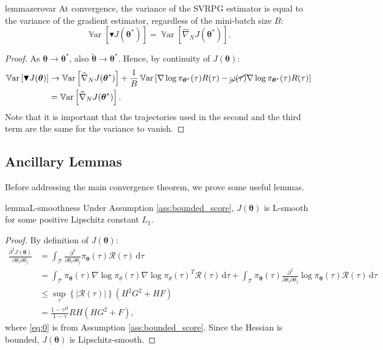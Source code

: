 \documentclass{article}
\theoremstyle{remark}
\theoremstyle{definition}
\DeclareMathOperator*{\Var}{\mathbb{V}ar}
\newcommand{\Dij}[2]{\frac{\partial^{2}{#1}}{\partial{#2}_i\partial{#2}_j}}
\newcommand{\de}{\,\mathrm{d}}
\newcommand{\vtheta}{\boldsymbol{\theta}}
\newcommand{\Tspace}{\mathcal{T}}
\newcommand{\Reward}{\mathcal{R}}
\newcommand{\pol}{\pi_{\vtheta}}
\newcommand{\score}[2]{\nabla\log\pi_{#1}(#2)}
\newcommand{\gradApp}[2]{\widehat{\nabla}_{#2}J(#1)}
\newcommand{\gradBlack}[1]{\blacktriangledown J(#1)}
\newcommand{\GRADLOG}{G}
\newcommand{\HESSLOG}{F}
\begin{document}
\begin{restatable}{lemma}{zerovar}\label{lemma:zerovar}
At convergence, the variance of the SVRPG estimator is equal to the variance of the gradient estimator, regardless of the mini-batch size $B$:
\[
	\Var\left[\gradBlack{\vtheta^*}\right] = 
	\Var\left[\gradApp{\vtheta^*}{N}\right].
\]
\end{restatable}
\begin{proof}
As $\vtheta\to\vtheta^*$, also $\tilde{\vtheta}\to\vtheta^*$. Hence, by continuity of $J(\vtheta)$:
\begin{align*}
\Var\left[\gradBlack{\vtheta}\right] &\to \Var\left[\gradApp{\vtheta^*}{N}\right] + \frac{1}{B}\Var\left[\score{\vtheta^*}{\tau}R(\tau) - \cancel{\omega(\tau)}\score{\vtheta^*}{\tau}R(\tau)\right] \\
&= \Var\left[\gradApp{\vtheta^*}{N}\right].
\end{align*}
Note that it is important that the trajectories used in the second and the third term are the same for the variance to vanish.
\end{proof}

\subsection*{Ancillary Lemmas}
Before addressing the main convergence theorem, we prove some useful lemmas.

 
\begin{restatable}[]{lemma}{L-smoothness}\label{lemma:lsmooth}
	Under Assumption \ref{ass:bounded_score}, $J(\vtheta)$ is L-smooth for some positive Lipschitz constant $L_1$.
\end{restatable}
\begin{proof}
By definition of $J(\vtheta)$:
\begin{align}
\Dij{J(\vtheta)}{\theta} 
&= \int_{\Tspace}\Dij{}{\theta}\pol(\tau)\Reward(\tau)\de \tau
\nonumber\\ 
&= \int_{\Tspace}\pol(\tau)\score{\theta}{\tau}\score{\theta}{\tau}^T\Reward(\tau)\de \tau + \int_{\Tspace}\pol(\tau)\Dij{}{\theta}\log\pol(\tau)\Reward(\tau)\de \tau \nonumber\\
&\leq \sup_{\tau} \left\{\left|\Reward(\tau)\right|\right\} \left(H^2\GRADLOG^2+H\HESSLOG\right) \label{eq:0}\\
&= \frac{1-\gamma^H}{1-\gamma}RH\left(H\GRADLOG^2+\HESSLOG\right),\nonumber
\end{align}
where \ref{eq:0} is from Assumption \ref{ass:bounded_score}.
Since the Hessian is bounded, $J(\vtheta)$ is Lipschitz-smooth.
\end{proof}
\end{document}
